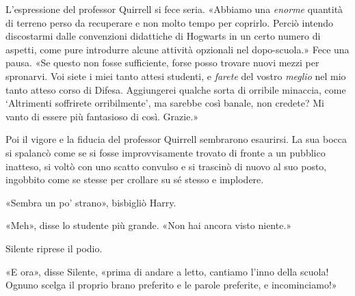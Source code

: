 L’espressione del professor Quirrell si fece seria. «Abbiamo una \textit{enorme} quantità di terreno perso da recuperare e non molto tempo per coprirlo. Perciò intendo discostarmi dalle convenzioni didattiche di Hogwarts in un certo numero di aspetti, come pure introdurre alcune attività opzionali nel dopo-scuola.» Fece una pausa. «Se questo non fosse sufficiente, forse posso trovare nuovi mezzi per spronarvi. Voi siete i miei tanto attesi studenti, e \textit{farete} del vostro \textit{meglio} nel mio tanto atteso corso di Difesa. Aggiungerei qualche sorta di orribile minaccia, come ‘Altrimenti soffrirete orribilmente’, ma sarebbe così banale, non credete? Mi vanto di essere più fantasioso di così. Grazie.»

Poi il vigore e la fiducia del professor Quirrell sembrarono esaurirsi. La sua bocca si spalancò come se si fosse improvvisamente trovato di fronte a un pubblico inatteso, si voltò con uno scatto convulso e si trascinò di nuovo al suo posto, ingobbito come se stesse per crollare su sé stesso e implodere.

«Sembra un po’ strano», bisbigliò Harry.

«Meh», disse lo studente più grande. «Non hai ancora visto niente.»

Silente riprese il podio.

«E ora», disse Silente, «prima di andare a letto, cantiamo l’inno della scuola! Ognuno scelga il proprio brano preferito e le parole preferite, e incominciamo!»



